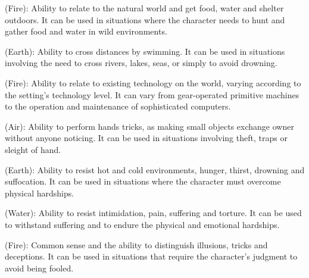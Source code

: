 \begin{multicols}{2}
\begin{ffcolpage}
 (Fire): Ability to relate to the natural world and get food, water and shelter outdoors. It can be used in situations where the character needs to hunt and gather food and water in wild environments.
\end{ffcolpage} \pw

\begin{ffcolpage}
 (Earth): Ability to cross distances by swimming. It can be used in situations involving the need to cross rivers, lakes, seas, or simply to avoid drowning.
\end{ffcolpage} \pw

\begin{ffcolpage}
 (Fire): Ability to relate to existing technology on the world, varying according to the setting’s technology level. It can vary from gear-operated primitive machines to the operation and maintenance of sophisticated computers.
\end{ffcolpage} \pw

\begin{ffcolpage}
 (Air): Ability to perform hands tricks, as making small objects exchange owner without anyone noticing. It can be used in situations involving theft, traps or sleight of hand.
\end{ffcolpage} \pw

\begin{ffcolpage}
 (Earth): Ability to resist hot and cold environments, hunger, thirst, drowning and suffocation. It can be used in situations where the character must overcome physical hardships.
\end{ffcolpage} \pw

\begin{ffcolpage}
 (Water): Ability to resist intimidation, pain, suffering and torture. It can be used to withstand suffering and to endure the physical and emotional hardships.
\end{ffcolpage} \pw

\begin{ffcolpage}
 (Fire): Common sense and the ability to distinguish illusions, tricks and deceptions. It can be used in situations that require the character’s judgment to avoid being fooled.
\end{ffcolpage}
\end{multicols}
